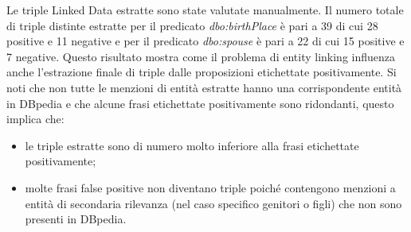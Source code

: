 Le triple Linked Data estratte sono state valutate manualmente. Il numero totale di triple distinte estratte per il predicato \textit{dbo:birthPlace} è pari a 39 di cui 28 positive e 11 negative e per il predicato \textit{dbo:spouse} è pari a 22 di cui 15 positive e 7 negative.
Questo risultato mostra come il problema di entity linking influenza anche l'estrazione finale di triple dalle proposizioni etichettate positivamente. Si noti che non tutte le menzioni di entità estratte hanno una corrispondente entità in DBpedia e che alcune frasi etichettate positivamente sono ridondanti, questo implica che:
\begin{itemize}
\item le triple estratte sono di numero molto inferiore alla frasi etichettate positivamente;
\item molte frasi false positive non diventano triple poiché contengono menzioni a entità di secondaria rilevanza (nel caso specifico genitori o figli) che non sono presenti in DBpedia.
\end{itemize}